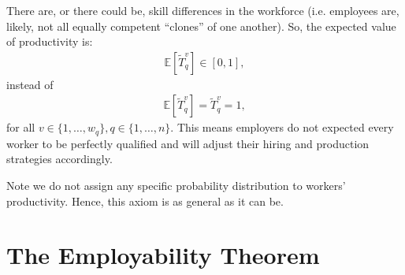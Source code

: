 \documentclass[hidelinks, nonatbib]{elsarticle}
\begin{document}
\begin{axiom}
    There are, or there could be, skill differences in the workforce (i.e. employees are, likely, not all equally competent ``clones'' of one another). So, the expected value of productivity is:
    \begin{gather}
        \mathbb{E}[
            \tilde{T}_{q}^{v}
        ]
        \in
        [0,1]
        ,
    \end{gather}
    instead of 
    \begin{gather}
        \mathbb{E}[
            \tilde{T}_{q}^{v}
        ]
        =
        \tilde{T}_{q}^{v}
        = 1
        ,
    \end{gather}
    for all $v \in \{1, \dots, w_q\}, q \in \{1, \dots, n\}$. This means employers do not expected every worker to be perfectly qualified and will adjust their hiring and production strategies accordingly.
    
    Note we do not assign any specific probability distribution to workers' productivity. Hence, this axiom is as general as it can be.
\end{axiom}


\section{The Employability Theorem}
\end{document}
